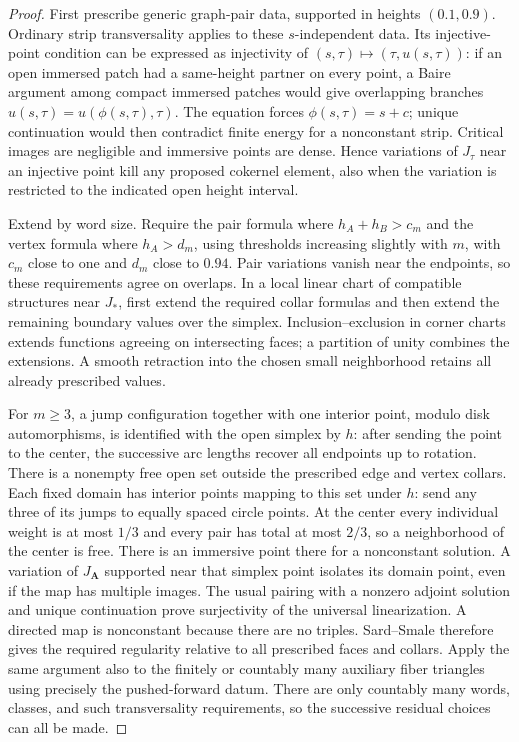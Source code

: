 \documentclass[11pt]{article}
\theoremstyle{definition}
\theoremstyle{remark}
\numberwithin{equation}{section}
\begin{document}
\begin{proof}
First prescribe generic graph-pair data, supported in heights
$(0.1,0.9)$.  Ordinary strip transversality applies to these
$s$-independent data.  Its injective-point condition can be expressed as
injectivity of $(s,\tau)\mapsto(\tau,u(s,\tau))$: if an open immersed
patch had a same-height partner on every point, a Baire argument among
compact immersed patches would give overlapping branches
$u(s,\tau)=u(\phi(s,\tau),\tau)$.  The equation forces
$\phi(s,\tau)=s+c$; unique continuation would then contradict finite
energy for a nonconstant strip.  Critical images are negligible and
immersive points are dense.  Hence variations of $J_\tau$ near an
injective point kill any proposed cokernel element, also when the
variation is restricted to the indicated open height interval.

Extend by word size.  Require the pair formula where
$h_A+h_B>c_m$ and the vertex formula where $h_A>d_m$, using thresholds
increasing slightly with $m$, with $c_m$ close to one and $d_m$ close to
$0.94$.  Pair variations vanish near the endpoints, so these requirements
agree on overlaps.  In a local linear chart of compatible structures
near $J_*$, first extend the required collar formulas and then extend
the remaining boundary values over the simplex.  Inclusion--exclusion
in corner charts extends functions agreeing on intersecting faces;
a partition of unity combines the extensions.  A smooth retraction
into the chosen small neighborhood retains all already prescribed
values.

For $m\geq3$, a jump configuration together with one interior point,
modulo disk automorphisms, is identified with the open simplex by $h$:
after sending the point to the center, the successive arc lengths
recover all endpoints up to rotation.  There is a nonempty free open
set outside the prescribed edge and vertex collars.  Each fixed domain
has interior points mapping to this set under $h$: send any three of
its jumps to equally spaced circle points.  At the center every
individual weight is at most $1/3$ and every pair has total at most
$2/3$, so a neighborhood of the center is free.  There is an
immersive point there for a nonconstant solution.  A variation of
$J_{\mathbf A}$ supported near that simplex point isolates its domain
point, even if the map has multiple images.  The usual pairing with a
nonzero adjoint solution and unique continuation prove surjectivity
of the universal linearization.  A directed map is nonconstant because
there are no triples.  Sard--Smale therefore gives the required
regularity relative to all prescribed faces and collars.  Apply the
same argument also to the finitely or countably many auxiliary fiber
triangles using precisely the pushed-forward datum.  There are only
countably many words, classes, and such transversality requirements,
so the successive residual choices can all be made.
\end{proof}
\end{document}
